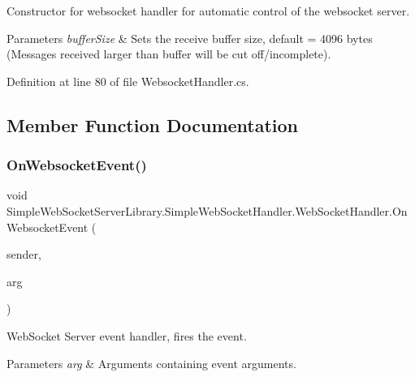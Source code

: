 Constructor for websocket handler for automatic control of the websocket server. 


\begin{DoxyParams}{Parameters}
{\em buffer\+Size} & Sets the receive buffer size, default = 4096 bytes (Messages received larger than buffer will be cut off/incomplete).\\
\hline
\end{DoxyParams}


Definition at line 80 of file Websocket\+Handler.\+cs.



\subsection{Member Function Documentation}
\mbox{\label{class_simple_web_socket_server_library_1_1_simple_web_socket_handler_1_1_web_socket_handler_a54df3f3848a5b8eecb4eba76ac9a328c}} 
\subsubsection{\texorpdfstring{On\+Websocket\+Event()}{OnWebsocketEvent()}}
{\footnotesize\ttfamily void Simple\+Web\+Socket\+Server\+Library.\+Simple\+Web\+Socket\+Handler.\+Web\+Socket\+Handler.\+On\+Websocket\+Event (\begin{DoxyParamCaption}\item[{object}]{sender,  }\item[{\mbox{\hyperlink{class_simple_web_socket_server_library_1_1_web_socket_event_arg}{Web\+Socket\+Event\+Arg}}}]{arg }\end{DoxyParamCaption})}



Web\+Socket Server event handler, fires the event. 


\begin{DoxyParams}{Parameters}
{\em arg} & Arguments containing event arguments.\\
\hline
\end{DoxyParams}


